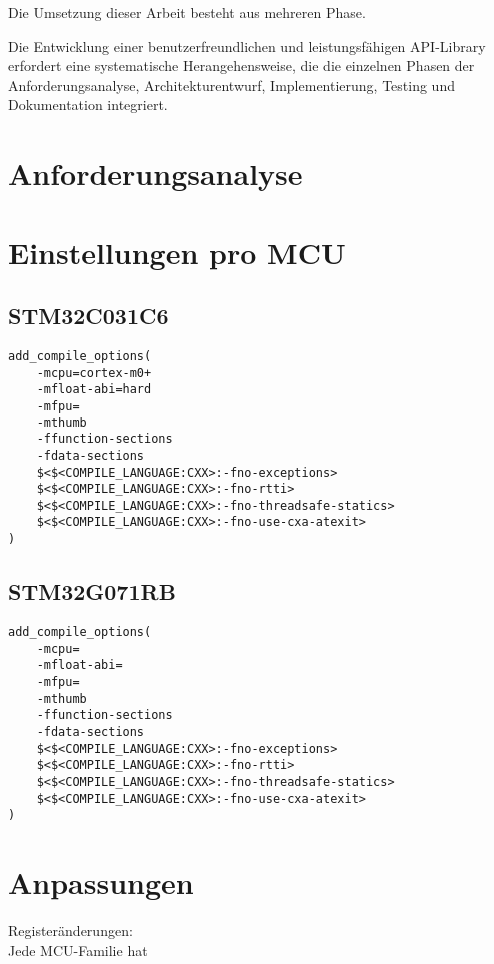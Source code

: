 Die Umsetzung dieser Arbeit besteht aus mehreren Phase.

Die Entwicklung einer benutzerfreundlichen und leistungsfähigen API-Library erfordert eine systematische Herangehensweise, die die einzelnen Phasen der Anforderungsanalyse, Architekturentwurf, Implementierung, Testing und Dokumentation integriert.
 

\section{Anforderungsanalyse}




\section{Einstellungen pro MCU}


\subsection{STM32C031C6}
\begin{lstlisting}
add_compile_options(
	-mcpu=cortex-m0+
	-mfloat-abi=hard
	-mfpu=
	-mthumb
	-ffunction-sections
	-fdata-sections
	$<$<COMPILE_LANGUAGE:CXX>:-fno-exceptions>
	$<$<COMPILE_LANGUAGE:CXX>:-fno-rtti>
	$<$<COMPILE_LANGUAGE:CXX>:-fno-threadsafe-statics>
	$<$<COMPILE_LANGUAGE:CXX>:-fno-use-cxa-atexit>		
)
\end{lstlisting}

\subsection{STM32G071RB}
\begin{lstlisting}
add_compile_options(
	-mcpu=
	-mfloat-abi=
	-mfpu=
	-mthumb
	-ffunction-sections
	-fdata-sections
	$<$<COMPILE_LANGUAGE:CXX>:-fno-exceptions>
	$<$<COMPILE_LANGUAGE:CXX>:-fno-rtti>
	$<$<COMPILE_LANGUAGE:CXX>:-fno-threadsafe-statics>
	$<$<COMPILE_LANGUAGE:CXX>:-fno-use-cxa-atexit>
)
\end{lstlisting}


\section{Anpassungen}
Registeränderungen:\\
Jede MCU-Familie hat

